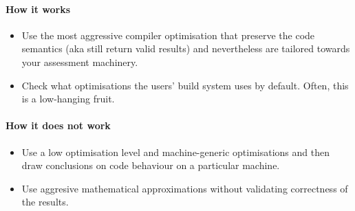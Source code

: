 \paragraph*{How it works}

\begin{itemize}[noitemsep]
  \item[$\boxplus$] Use the most aggressive compiler optimisation that preserve the code semantics (aka still return valid results) and nevertheless are tailored towards your assessment machinery.
  \item[$\boxplus$] Check what optimisations the users' build system uses by default. Often, this is a low-hanging fruit.
\end{itemize}


\paragraph*{How it does not work}

\begin{itemize}[noitemsep]
  \item[$\boxminus$] Use a low optimisation level and machine-generic optimisations and then draw conclusions on code behaviour on a particular machine.
  \item[$\boxminus$] Use aggresive mathematical approximations without validating correctness of the results.
\end{itemize}

